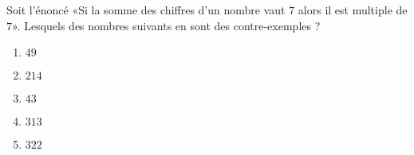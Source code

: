 
\begin{exercice}\label{exosmath-0891}

    Soit l'énoncé «Si la somme des chiffres d'un nombre vaut \( 7\) alors il est multiple de \( 7\)».  Lesquels des nombres suivants en sont des contre-exemples ?
    \begin{multicols}{2}
        \begin{enumerate}
            \item
                \( 49\)
            \item
                \( 214\)
            \item
                \( 43\)
            \item
                \( 313\)
            \item
                \( 322\)
        \end{enumerate}
    \end{multicols}

\end{exercice}
